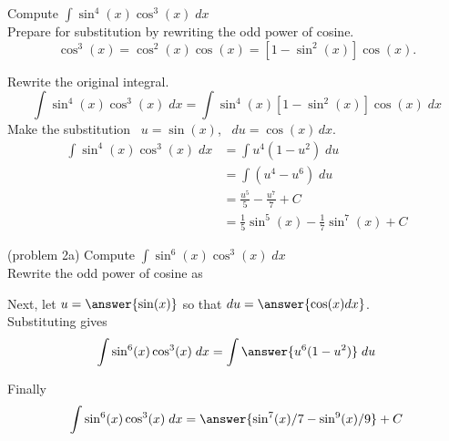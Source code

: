 \documentclass[handout]{ximera}
\begin{document}
\begin{example}[example 2]
Compute $\displaystyle{\int \sin^4(x)\cos^3(x) \; dx}$\\


Prepare for substitution by rewriting the odd power of cosine.
\[
\cos^3(x) = \cos^2(x) \cos(x) = \left[1 - \sin^2(x)\right] \cos(x).
\]

Rewrite the original integral.
\[
\int \sin^4(x)\cos^3(x) \; dx = \int \sin^4(x)\left[1 - \sin^2(x)\right] \cos(x) \; dx
\]
Make the substitution \, $u = \sin(x)$,  \, $du = \cos(x) \, dx$.
\begin{align*}
\int \sin^4(x)\cos^3(x) \; dx &= \int u^4 (1-u^2) \; du\\
   &= \int (u^4 -u^6) \; du\\
  &= \frac{u^5}{5} - \frac{u^7}{7} + C \\
  &= \frac15 \sin^5(x) - \frac17 \sin^7(x) + C
\end{align*}
  
\end{example}



\begin{problem}(problem 2a)
Compute $\displaystyle{\int \sin^6(x)\cos^3(x) \; dx}$\\

Rewrite the odd power of cosine as

\begin{multipleChoice}
\end{multipleChoice}

Next, let $u = \answer{\sin(x)}$ so that $du = \answer{\cos(x) dx}$.\\

Substituting gives 
\[
\int \sin^6(x)\cos^3(x) \; dx= \int \answer{u^6(1-u^2)} \; du
\]

Finally 
\[
\int \sin^6(x)\cos^3(x) \; dx= \answer{\sin^7(x)/7 -  \sin^9(x)/9} + C
\]

\end{problem}
\end{document}
